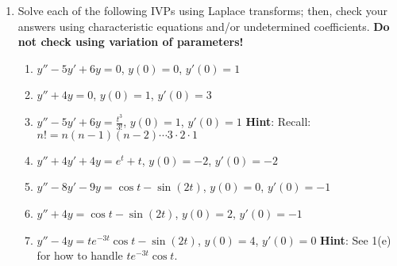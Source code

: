 \documentclass[12pt]{article}
\newcommand{\hint}[1]{\quad\textbf{Hint}: #1}
\begin{document}
\begin{enumerate}
\begin{enumerate}
			\hint{Let $\delta(t)$ denote the function from (e) [which you don't know] and use long division!}
		\end{enumerate}
		
		\item Solve each of the following IVPs using Laplace transforms; then, check your answers using characteristic equations and/or undetermined coefficients. \textbf{Do not check using variation of parameters!}
		\begin{enumerate}[itemsep=1.1in]
			\item $y''-5y'+6y=0$, $y(0)=0$, $y'(0)=1$
			\item $y''+4y=0$, $y(0)=1$, $y'(0)=3$
			\item $y''-5y'+6y=\frac{t^3}{3!}$, $y(0)=1$, $y'(0)=1$ \hint{Recall: $n!=n(n-1)(n-2)\cdots3\cdot2\cdot1$}
			\item $y''+4y'+4y=e^t+t$, $y(0)=-2$, $y'(0)=-2$
			\item $y''-8y'-9y=\cos{t}-\sin(2t)$, $y(0)=0$, $y'(0)=-1$
			\item $y''+4y=\cos{t}-\sin(2t)$, $y(0)=2$, $y'(0)=-1$
			\item $y''-4y=te^{-3t}\cos{t}-\sin(2t)$, $y(0)=4$, $y'(0)=0$ \hint{See 1(e) for how to handle $te^{-3t}\cos{t}$.}
		\end{enumerate} 
		
	\end{enumerate}
\end{document}
